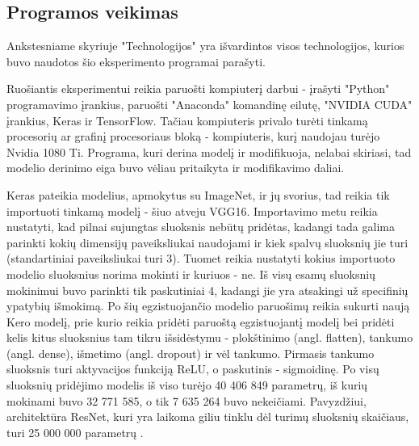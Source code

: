\documentclass{VUMIFPSkursinis}
\begin{document}

\subsection{Programos veikimas}
Ankstesniame skyriuje "Technologijos" yra išvardintos visos technologijos, kurios buvo naudotos šio eksperimento programai parašyti.

Ruošiantis eksperimentui reikia paruošti kompiuterį darbui - įrašyti "Python" programavimo įrankius, paruošti "Anaconda" komandinę eilutę, "NVIDIA CUDA" įrankius, Keras ir 
TensorFlow. Tačiau kompiuteris privalo turėti tinkamą procesorių ar grafinį procesoriaus bloką - kompiuteris, kurį naudojau turėjo Nvidia 1080 Ti. Programa, kuri 
derina modelį ir modifikuoja, nelabai skiriasi, tad modelio derinimo eiga buvo vėliau pritaikyta ir modifikavimo daliai. 
 
Keras pateikia modelius, apmokytus su ImageNet, ir jų svorius, tad reikia tik importuoti 
tinkamą modelį - šiuo atveju VGG16. Importavimo metu reikia nustatyti, kad pilnai sujungtas sluoksnis nebūtų pridėtas, kadangi tada galima parinkti kokių dimensijų 
paveiksliukai naudojami ir kiek spalvų sluoksnių jie turi (standartiniai paveiksliukai turi 3). Tuomet reikia nustatyti kokius importuoto modelio sluoksnius norima 
mokinti ir kuriuos - ne. Iš visų esamų sluoksnių mokinimui buvo parinkti tik paskutiniai 4, kadangi jie yra atsakingi už specifinių ypatybių išmokimą. Po šių egzistuojančio 
modelio paruošimų reikia sukurti naują Kero modelį, prie kurio reikia pridėti paruoštą egzistuojantį modelį bei pridėti kelis kitus sluoksnius tam tikru išsidėstymu - 
plokštinimo (angl. flatten), tankumo (angl. dense), išmetimo (angl. dropout) ir vėl tankumo. Pirmasis tankumo sluoksnis turi aktyvacijos funkciją ReLU, o paskutinis - sigmoidinę. Po visų sluoksnių pridėjimo modelis iš 
viso turėjo 40 406 849 parametrų, iš kurių mokinami buvo 32 771 585, o tik 7 635 264 buvo nekeičiami. Pavyzdžiui, architektūra ResNet, kuri yra laikoma giliu tinklu dėl turimų sluoksnių skaičiaus, turi 25 000 000 parametrų \cite{DBLP:journals/corr/HeZRS15}.
\end{document}
